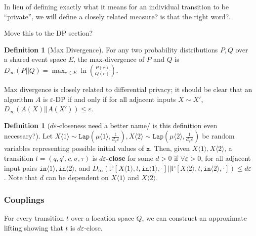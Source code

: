 \documentclass[12pt]{article}
\newcommand{\PP}{\mathbb{P}}
\newcommand{\brangle}[1]{\langle#1 \rangle}
\newcommand{\Lap}{\texttt{Lap}}
\theoremstyle{definition}
\newtheorem{defn}[thm]{Definition}
\begin{document}
In lieu of defining exactly what it means for an individual transition to be ``private'', we will define a closely related {\color{red}measure? is that the right word?}.

{\color{red} Move this to the DP section?}

\begin{defn}[Max Divergence]
    For any two probability distributions $P, Q$ over a shared event space $E$, the max-divergence of $P$ and $Q$ is 
    $D_{\infty}(P||Q) = \max_{e\in E}\ln\left(\frac{P(e)}{Q(e)}\right)$.
\end{defn}

Max divergence is closely related to differential privacy; it should be clear that an algorithm $A$ is $\varepsilon$-DP if and only if for all adjacent inputs $X\sim X'$, $D_{\infty}(A(X)||A(X'))\leq \varepsilon$. 

\begin{defn}[$d\varepsilon$-closeness{\color{red} need a better name/ is this definition even necessary?}]
    Let $X\brangle{1}\sim \Lap(\mu\brangle{1}, \frac{1}{d_x\varepsilon}), X\brangle{2}\sim\Lap(\mu\brangle{2}, \frac{1}{d_x\varepsilon})$ be random variables representing possible initial values of $\texttt{x}$. 
    Then, given $X\brangle{1}, X\brangle{2}$, a transition $t=(q, q', c, \sigma, \tau)$ is \textbf{$d\varepsilon$-close} for some $d>0$ if $\forall \varepsilon> 0$, for all adjacent input pairs $\texttt{in}\brangle{1}, \texttt{in}\brangle{2}$, and $D_{\infty}(\PP[X\brangle{1}, t, \texttt{in}\brangle{1}, \cdot]||\PP[X\brangle{2}, t, \texttt{in}\brangle{2}, \cdot])\leq d\varepsilon$. Note that $d$ can be dependent on $X\brangle{1}$ and $X\brangle{2}$.
\end{defn}


\subsubsection{Couplings}

For every transition $t$ over a location space $Q$, we can construct an approximate lifting showing that $t$ is $d\varepsilon$-close. 
\end{document}
